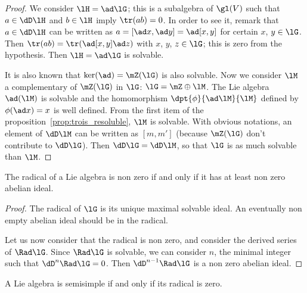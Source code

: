 \begin{proof}
	We consider $\lH=\ad\lG$; this is a subalgebra of $\gl(V)$ such that $a\in\dD\lH$ and $b\in\lH$ imply $\tr(ab)=0$. In order to see it, remark that $a\in\dD\lH$ can be written as $a=[\ad x,\ad y]=\ad[x,y]$ for certain $x$, $y\in\lG$. Then $\tr(ab)=\tr(\ad[x,y]\ad z)$ with $x$, $y$, $z\in\lG$; this is zero from the hypothesis. Then $\lH=\ad\lG$ is solvable.

	It is also known that $\ker(\ad)=\mZ(\lG)$ is also solvable. Now we consider $\lM$ a complementary of $\mZ(\lG)$ in $\lG$: $\lG=\mZ\oplus\lM$. The Lie algebra $\ad(\lM)$ is solvable and the homomorphism $\dpt{\phi}{\ad\lM}{\lM}$ defined by $\phi(\ad x)=x$ is well defined. From the first item of the proposition~\ref{prop:trois_resoluble}, $\lM$ is solvable. With obvious notations, an element of $\dD\lM$ can be written as $[m,m']$ (because $\mZ(\lG)$ don't contribute to $\dD\lG$). Then $\dD\lG=\dD\lM$, so that $\lG$ is as much solvable than $\lM$.
\end{proof}


\begin{lemma}
	The radical of a Lie algebra is non zero if and only if it has at least non zero abelian ideal.
	\label{lem:ss_ideal}
\end{lemma}

\begin{proof}
	The radical of $\lG$ is its unique maximal solvable ideal. An eventually non empty abelian ideal should be in the radical.

	Let us now consider that the radical is non zero, and consider the derived series of $\Rad\lG$. Since $\Rad\lG$ is solvable, we can consider $n$, the minimal integer such that $\dD^n\Rad\lG=0$. Then $\dD^{n-1}\Rad\lG$ is a non zero abelian ideal.
\end{proof}


\begin{theorem}     \label{ThoRadicalEquivSS}
	A Lie algebra is semisimple if and only if its radical is zero.
\end{theorem}

